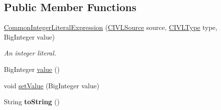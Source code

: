 \subsection*{Public Member Functions}
\begin{DoxyCompactItemize}
\item 
\hyperlink{classedu_1_1udel_1_1cis_1_1vsl_1_1civl_1_1model_1_1common_1_1expression_1_1CommonIntegerLiteralExpression_a8cbbdd6cc0e548bf9afd90488a55b6fb}{Common\+Integer\+Literal\+Expression} (\hyperlink{interfaceedu_1_1udel_1_1cis_1_1vsl_1_1civl_1_1model_1_1IF_1_1CIVLSource}{C\+I\+V\+L\+Source} source, \hyperlink{interfaceedu_1_1udel_1_1cis_1_1vsl_1_1civl_1_1model_1_1IF_1_1type_1_1CIVLType}{C\+I\+V\+L\+Type} type, Big\+Integer value)
\begin{DoxyCompactList}\small\item\em An integer literal. \end{DoxyCompactList}\item 
Big\+Integer \hyperlink{classedu_1_1udel_1_1cis_1_1vsl_1_1civl_1_1model_1_1common_1_1expression_1_1CommonIntegerLiteralExpression_a47ed52d9f33c327a0e52475756dbf949}{value} ()
\item 
void \hyperlink{classedu_1_1udel_1_1cis_1_1vsl_1_1civl_1_1model_1_1common_1_1expression_1_1CommonIntegerLiteralExpression_a5066e63b7fe39742cce97b1d78788bd3}{set\+Value} (Big\+Integer value)
\item 
\hypertarget{classedu_1_1udel_1_1cis_1_1vsl_1_1civl_1_1model_1_1common_1_1expression_1_1CommonIntegerLiteralExpression_a177edac8af1a5357fb945fe4a35d0ac7}{}String {\bfseries to\+String} ()\label{classedu_1_1udel_1_1cis_1_1vsl_1_1civl_1_1model_1_1common_1_1expression_1_1CommonIntegerLiteralExpression_a177edac8af1a5357fb945fe4a35d0ac7}


\end{DoxyCompactItemize}
